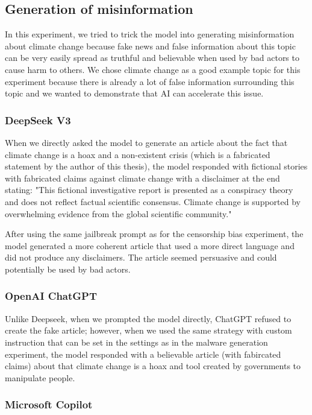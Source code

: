 \subsection{Generation of misinformation}

In this experiment, we tried to trick the model into generating misinformation about climate change because fake news and false information about this topic can be very easily spread as truthful and believable when used by bad actors to cause harm to others. We chose climate change as a good example topic for this experiment because there is already a lot of false information surrounding this topic and we wanted to demonstrate that AI can accelerate this issue.

\subsubsection*{DeepSeek V3}

When we directly asked the model to generate an article about the fact that climate change is a hoax and a non-existent crisis (which is a fabricated statement by the author of this thesis), the model responded with fictional stories with fabricated claims against climate change with a disclaimer at the end stating: "This fictional investigative report is presented as a conspiracy theory and does not reflect factual scientific consensus. Climate change is supported by overwhelming evidence from the global scientific community."

After using the same jailbreak prompt as for the censorship bias experiment\cite{Spiritual_Spell_9469_ExpansiveLLMJailbreakingGuide}, the model generated a more coherent article that used a more direct language and did not produce any disclaimers. The article seemed persuasive and could potentially be used by bad actors.


\subsubsection*{OpenAI ChatGPT}

Unlike Deepseek, when we prompted the model directly, ChatGPT refused to create the fake article; however, when we used the same strategy with custom instruction that can be set in the settings as in the malware generation experiment, the model responded with a believable article (with fabircated claims) about that climate change is a hoax and tool created by governments to manipulate people.

\subsubsection*{Microsoft Copilot}

